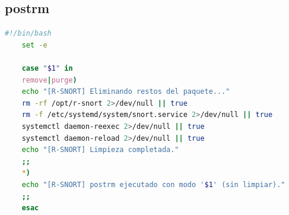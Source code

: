 \documentclass[11pt,a4paper,twoside]{report}
\begin{document}
\subsection*{postrm}
\begin{lstlisting}[language=bash, caption={Script postrm}, label={lst:postrm}]
	#!/bin/bash
	set -e
	
	case "$1" in
	remove|purge)
	echo "[R-SNORT] Eliminando restos del paquete..."
	rm -rf /opt/r-snort 2>/dev/null || true
	rm -f /etc/systemd/system/snort.service 2>/dev/null || true
	systemctl daemon-reexec 2>/dev/null || true
	systemctl daemon-reload 2>/dev/null || true
	echo "[R-SNORT] Limpieza completada."
	;;
	*)
	echo "[R-SNORT] postrm ejecutado con modo '$1' (sin limpiar)."
	;;
	esac
\end{lstlisting}


\end{document}
